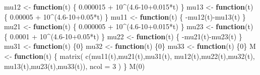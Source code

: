 \documentclass[
]{book}
\newenvironment{Shaded}{\begin{snugshade}}{\end{snugshade}}
\newcommand{\AttributeTok}[1]{\textcolor[rgb]{0.77,0.63,0.00}{#1}}
\newcommand{\ControlFlowTok}[1]{\textcolor[rgb]{0.13,0.29,0.53}{\textbf{#1}}}
\newcommand{\DecValTok}[1]{\textcolor[rgb]{0.00,0.00,0.81}{#1}}
\newcommand{\FloatTok}[1]{\textcolor[rgb]{0.00,0.00,0.81}{#1}}
\newcommand{\FunctionTok}[1]{\textcolor[rgb]{0.00,0.00,0.00}{#1}}
\newcommand{\NormalTok}[1]{#1}
\newcommand{\OtherTok}[1]{\textcolor[rgb]{0.56,0.35,0.01}{#1}}
\newcommand{\SpecialCharTok}[1]{\textcolor[rgb]{0.00,0.00,0.00}{#1}}
\begin{document}
\begin{Shaded}
\begin{Highlighting}[]
\NormalTok{mu12 }\OtherTok{\textless{}{-}} \ControlFlowTok{function}\NormalTok{(t) \{}
  \FloatTok{0.000015} \SpecialCharTok{+} \DecValTok{10}\SpecialCharTok{\^{}}\NormalTok{(}\FloatTok{4.6}\DecValTok{{-}10}\FloatTok{+0.015}\SpecialCharTok{*}\NormalTok{t)}
\NormalTok{\}}
\NormalTok{mu13 }\OtherTok{\textless{}{-}} \ControlFlowTok{function}\NormalTok{(t) \{}
  \FloatTok{0.00005} \SpecialCharTok{+} \DecValTok{10}\SpecialCharTok{\^{}}\NormalTok{(}\FloatTok{4.6}\DecValTok{{-}10}\FloatTok{+0.05}\SpecialCharTok{*}\NormalTok{t)}
\NormalTok{\}}
\NormalTok{mu11 }\OtherTok{\textless{}{-}} \ControlFlowTok{function}\NormalTok{(t) \{}
  \SpecialCharTok{{-}}\FunctionTok{mu12}\NormalTok{(t)}\SpecialCharTok{{-}}\FunctionTok{mu13}\NormalTok{(t)}
\NormalTok{\}}
\NormalTok{mu21 }\OtherTok{\textless{}{-}} \ControlFlowTok{function}\NormalTok{(t) \{}
  \FloatTok{0.000005} \SpecialCharTok{+} \DecValTok{10}\SpecialCharTok{\^{}}\NormalTok{(}\FloatTok{4.6}\DecValTok{{-}10}\FloatTok{+0.015}\SpecialCharTok{*}\NormalTok{t)}
\NormalTok{\}}
\NormalTok{mu23 }\OtherTok{\textless{}{-}} \ControlFlowTok{function}\NormalTok{(t) \{}
  \FloatTok{0.0001} \SpecialCharTok{+} \DecValTok{10}\SpecialCharTok{\^{}}\NormalTok{(}\FloatTok{4.6}\DecValTok{{-}10}\FloatTok{+0.05}\SpecialCharTok{*}\NormalTok{t)}
\NormalTok{\}}
\NormalTok{mu22 }\OtherTok{\textless{}{-}} \ControlFlowTok{function}\NormalTok{(t) \{}
  \SpecialCharTok{{-}}\FunctionTok{mu21}\NormalTok{(t)}\SpecialCharTok{{-}}\FunctionTok{mu23}\NormalTok{(t)}
\NormalTok{\}}
\NormalTok{mu31 }\OtherTok{\textless{}{-}} \ControlFlowTok{function}\NormalTok{(t) \{}\DecValTok{0}\NormalTok{\}}
\NormalTok{mu32 }\OtherTok{\textless{}{-}} \ControlFlowTok{function}\NormalTok{(t) \{}\DecValTok{0}\NormalTok{\}}
\NormalTok{mu33 }\OtherTok{\textless{}{-}} \ControlFlowTok{function}\NormalTok{(t) \{}\DecValTok{0}\NormalTok{\}}
\NormalTok{M }\OtherTok{\textless{}{-}} \ControlFlowTok{function}\NormalTok{(t) \{}
  \FunctionTok{matrix}\NormalTok{(}
    \FunctionTok{c}\NormalTok{(}\FunctionTok{mu11}\NormalTok{(t),}\FunctionTok{mu21}\NormalTok{(t),}\FunctionTok{mu31}\NormalTok{(t),}
      \FunctionTok{mu12}\NormalTok{(t),}\FunctionTok{mu22}\NormalTok{(t),}\FunctionTok{mu32}\NormalTok{(t),}
      \FunctionTok{mu13}\NormalTok{(t),}\FunctionTok{mu23}\NormalTok{(t),}\FunctionTok{mu33}\NormalTok{(t)),}
    \AttributeTok{ncol =} \DecValTok{3}
\NormalTok{  )}
\NormalTok{\}}
\FunctionTok{M}\NormalTok{(}\DecValTok{0}\NormalTok{)}
\end{Highlighting}
\end{Shaded}
\end{document}

